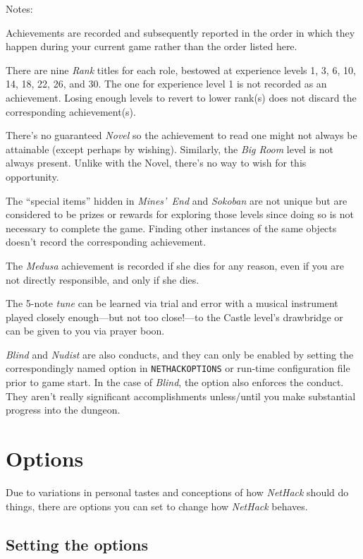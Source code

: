 \noindent
Notes:

Achievements are recorded and subsequently reported in the order in which
they happen during your current game rather than the order listed here.

There are nine {\it Rank} titles for each role, bestowed at experience
levels 1, 3, 6, 10, 14, 18, 22, 26, and 30.
The one for experience level 1 is not recorded as an achievement.
Losing enough levels to revert to lower rank(s) does not discard the
corresponding achievement(s).

There's no guaranteed {\it Novel} so the achievement to read one might
not always be attainable (except perhaps by wishing).
Similarly, the {\it Big Room} level is not always present.
Unlike with the Novel, there's no way to wish for this opportunity.

The ``special items'' hidden in {\it Mines'~End\/} and {\it Sokoban\/}
are not unique but are considered to be prizes or rewards
for exploring those levels since doing so is not necessary to complete
the game.
Finding other instances of the same objects doesn't record the
corresponding achievement.

The {\it Medusa\/} achievement is recorded if she dies for any reason,
even if you are not directly responsible, and only if she dies.

The 5-note {\it tune\/} can be learned via trial and error with a musical
instrument played closely
enough---but not too close!---to
the Castle level's drawbridge or can be given to you via prayer boon.

{\it Blind\/} and {\it Nudist\/} are also conducts, and they can only be
enabled by setting the correspondingly named option in {\tt NETHACKOPTIONS}
or run-time configuration file prior to game start.
In the case of {\it Blind\/}, the option also enforces the conduct.
They aren't really significant accomplishments unless/until you make
substantial progress into the dungeon.

\section{Options}

Due to variations in personal tastes and conceptions of how {\it NetHack\/}
should do things, there are options you can set to change how {\it NetHack\/}
behaves.

\subsection*{Setting the options}

